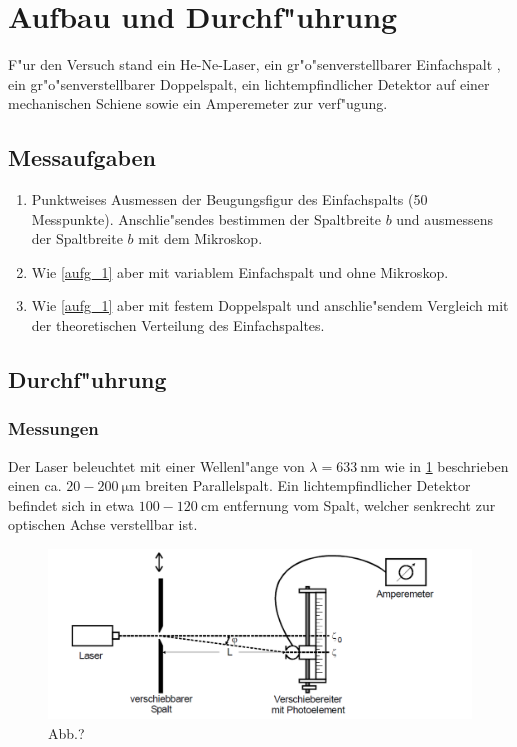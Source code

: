 \section{Aufbau und Durchf"uhrung}
	\label{sec:durchfueuhrung}
	F"ur den Versuch stand ein He-Ne-Laser, ein gr"o"senverstellbarer Einfachspalt , ein gr"o"senverstellbarer Doppelspalt, ein lichtempfindlicher Detektor auf einer mechanischen Schiene sowie ein Amperemeter zur verf"ugung.

	\subsection{Messaufgaben}
		\begin{enumerate}
			\item \label{aufg_1} Punktweises Ausmessen der Beugungsfigur des Einfachspalts (50 Messpunkte). Anschlie"sendes bestimmen der Spaltbreite $b$ und ausmessens der Spaltbreite $b$ mit dem Mikroskop.

			\item \label{aufg_2} Wie \ref{aufg_1} aber mit variablem Einfachspalt und ohne Mikroskop. 

			\item \label{aufg_3} Wie \ref{aufg_1} aber mit festem Doppelspalt und anschlie"sendem Vergleich mit der theoretischen Verteilung des Einfachspaltes.
		\end{enumerate}

	\subsection{Durchf"uhrung}
		\label{sec:durchfuehrung}
		\subsubsection{Messungen}
			\label{sec:messung}

			Der Laser beleuchtet mit einer Wellenl"ange von $\lambda = \SI{633}{\nano \meter}$ wie in \ref{Versuchsaufbau} beschrieben einen ca. $20 - 200 \SI{}{\micro \meter}$ breiten Parallelspalt. Ein lichtempfindlicher Detektor befindet sich in etwa $100 - 120 \SI{}{\centi \meter}$ entfernung vom Spalt, welcher senkrecht zur optischen Achse verstellbar ist.

			\begin{figure}[h]
					\centering
					\includegraphics[width = 14cm]{Versuchsaufbau.png}
					\caption{Abb.?}
					\label{Versuchsaufbau}
			\end{figure}

